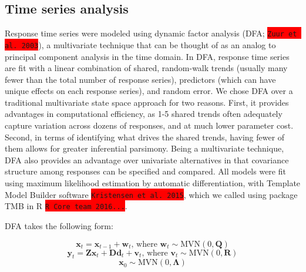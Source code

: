 \documentclass{article}
\begin{document}

\subsection*{Time series analysis}

Response time series were modeled using dynamic factor analysis (DFA; \colorbox{red}{\lstinline{Zuur et al. 2003}}), a multivariate technique that can be thought of as an analog to principal component analysis in the time domain. In DFA, response time series are fit with a linear combination of shared, random-walk trends (usually many fewer than the total number of response series), predictors (which can have unique effects on each response series), and random error. We chose DFA over a traditional multivariate state space approach for two reasons. First, it provides advantages in computational efficiency, as 1-5 shared trends often adequately capture variation across dozens of responses, and at much lower parameter cost. Second, in terms of identifying what drives the shared trends, having fewer of them allows for greater inferential parsimony. Being a multivariate technique, DFA also provides an advantage over univariate alternatives in that covariance structure among responses can be specified and compared. All models were fit using maximum likelihood estimation by automatic differentiation, with Template Model Builder software \colorbox{red}{\lstinline{Kristensen et al. 2015}}, which we called using package TMB in R \colorbox{red}{\lstinline{R Core team 2016...}}.

DFA takes the following form:

\begin{equation}
    \textbf{x}_t = \textbf{x}_{t-1} + \textbf{w}_t\textrm{, where } \textbf{w}_t \sim \textrm{MVN}(0,\textbf{Q})
\end{equation}
\begin{equation}
    \textbf{y}_t = \textbf{Zx}_t + \textbf{Dd}_t + \textbf{v}_t\textrm{, where } \textbf{v}_t \sim \textrm{MVN}(0,\textbf{R})
\end{equation}
\begin{equation}
    \textbf{x}_0 \sim \textrm{MVN}(0,\bm{\Lambda})
\end{equation}
\end{document}
